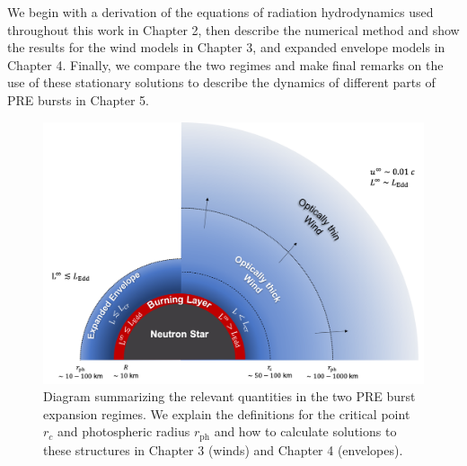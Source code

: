 \documentclass[../main.tex]{subfiles}
\begin{document}

We begin with a derivation of the equations of radiation hydrodynamics used throughout this work in Chapter 2, then describe the numerical method and show the results for the wind models in Chapter 3, and expanded envelope models in Chapter 4. Finally, we compare the two regimes and make final remarks on the use of these stationary solutions to describe the dynamics of different parts of PRE bursts in Chapter 5.

\begin{figure}[htb!]
    \centering
    \includegraphics[width=\textwidth]{figures/diagram.png}
    \caption[Diagram of PRE burst expansion regimes]{Diagram summarizing the relevant quantities in the two PRE burst expansion regimes. We explain the definitions for the critical point $r_c$ and photospheric radius $r_\text{ph}$ and how to calculate solutions to these structures in Chapter 3 (winds) and Chapter 4 (envelopes).}
    \label{fig:diagram}
\end{figure}

\biblio
\end{document}
